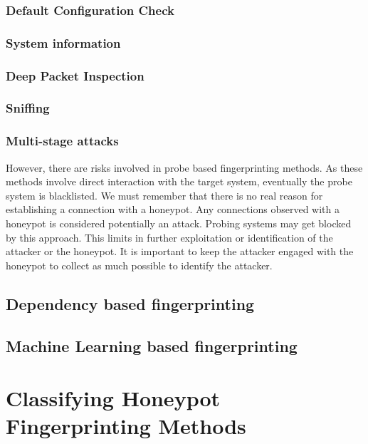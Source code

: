 \documentclass[letterpaper, 10 pt, conference]{ieeeconf}  %
\begin{document}
\subsubsection{Default Configuration Check}

\subsubsection{System information}

\subsubsection{Deep Packet Inspection}

\subsubsection{Sniffing}

\subsubsection{Multi-stage attacks}


However, there are risks involved in probe based fingerprinting methods. As these methods involve direct interaction with the target system, eventually the probe system is blacklisted. We must remember that there is no real reason for establishing a connection with a honeypot. Any connections observed with a honeypot is considered potentially an attack. Probing systems may get blocked by this approach. This limits in further exploitation or identification of the attacker or the honeypot. It is important to keep the attacker engaged with the honeypot to collect as much possible to identify the attacker. 


\subsection{Dependency based fingerprinting}


\subsection{Machine Learning based fingerprinting}









 \section{Classifying Honeypot Fingerprinting Methods}
   
\end{document}
